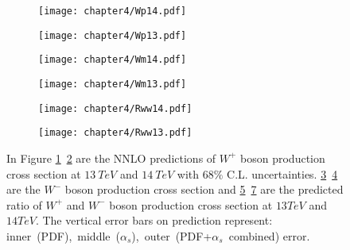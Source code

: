 \documentclass[a4paper,12pt]{report}
\numberwithin{equation}{section}
\begin{document}
\begin{figure}[H]
\centering
\begin{subfigure}{0.49\textwidth}
\texttt{[image: chapter4/Wp14.pdf]}

\caption{}
\label{w+14}
\end{subfigure}
\begin{subfigure}{0.49\textwidth}
\texttt{[image: chapter4/Wp13.pdf]}
\caption{}
\label{w+13}
\end{subfigure}
\begin{subfigure}{0.49\textwidth}
\texttt{[image: chapter4/Wm14.pdf]}

\caption{}
\label{w-14}
\end{subfigure}
\begin{subfigure}{0.49\textwidth}
\texttt{[image: chapter4/Wm13.pdf]}

\caption{}
\label{w-13}
\end{subfigure}
\begin{subfigure}{0.49\textwidth}
\texttt{[image: chapter4/Rww14.pdf]}

\caption{}
\label{Rww14}
\end{subfigure}
\begin{subfigure}{0.49\textwidth}
\texttt{[image: chapter4/Rww13.pdf]}

\caption{}
\label{Rww13}
\end{subfigure}
\caption{In Figure \ref{w+14}~\ref{w+13} are the NNLO predictions of $W^{+}$ boson production cross section at $13~TeV$ and $14~TeV$ with $68\%$ C.L. uncertainties. \ref{w-14}~\ref{w-13} are the $W^{-}$ boson production cross section and \ref{Rww14}~\ref{Rww13} are the predicted ratio of $W^{+}$ and $W^{-}$ boson production cross section at $13TeV$ and $14TeV$. The vertical error bars on prediction represent: inner~(PDF),~middle~($\alpha_{s}$),~outer~(PDF+$\alpha_{s}$~combined) error. } 
\end{figure}
\end{document}
